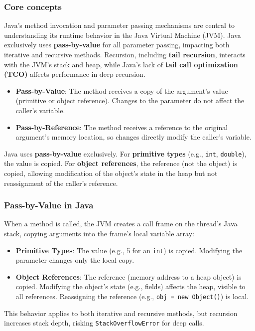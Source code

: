 \documentclass{article}
\begin{document}
\subsubsection{Core concepts}
Java’s method invocation and parameter passing mechanisms are central to understanding its runtime behavior in the Java Virtual Machine (JVM). Java exclusively uses \textbf{pass-by-value} for all parameter passing, impacting both iterative and recursive methods. Recursion, including \textbf{tail recursion}, interacts with the JVM’s stack and heap, while Java’s lack of \textbf{tail call optimization (TCO)} affects performance in deep recursion. 
\begin{itemize}
	\item \textbf{Pass-by-Value}: The method receives a copy of the argument’s value (primitive or object reference). Changes to the parameter do not affect the caller’s variable.
	\item \textbf{Pass-by-Reference}: The method receives a reference to the original argument’s memory location, so changes directly modify the caller’s variable.
\end{itemize}
Java uses \textbf{pass-by-value} exclusively. For \textbf{primitive types} (e.g., \texttt{int}, \texttt{double}), the value is copied. For \textbf{object references}, the reference (not the object) is copied, allowing modification of the object’s state in the heap but not reassignment of the caller’s reference.

\subsubsection{Pass-by-Value in Java}
When a method is called, the JVM creates a call frame on the thread’s Java stack, copying arguments into the frame’s local variable array:
\begin{itemize}
	\item \textbf{Primitive Types}: The value (e.g., 5 for an \texttt{int}) is copied. Modifying the parameter changes only the local copy.
	\item \textbf{Object References}: The reference (memory address to a heap object) is copied. Modifying the object’s state (e.g., fields) affects the heap, visible to all references. Reassigning the reference (e.g., \texttt{obj = new Object()}) is local.
\end{itemize}
This behavior applies to both iterative and recursive methods, but recursion increases stack depth, risking \texttt{StackOverflowError} for deep calls.
\end{document}
